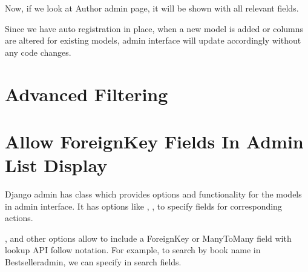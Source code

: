 \documentclass[letterpaper,12pt,english]{sphinxmanual}
\begin{document}
Now, if we look at Author admin page, it will be shown with all relevant fields.


Since we have auto registration in place, when a new model is added or columns are altered for existing models, admin interface will update accordingly without any code changes.


\chapter{Advanced Filtering}
\label{\detokenize{admin_filter:advanced-filtering}}\label{\detokenize{admin_filter::doc}}

\chapter{Allow ForeignKey Fields In Admin List Display}
\label{\detokenize{admin_list_display_foreignkey:allow-foreignkey-fields-in-admin-list-display}}\label{\detokenize{admin_list_display_foreignkey::doc}}
Django admin has  class which provides options and functionality for the models in admin interface. It has options like , ,  to specify fields for corresponding actions.

,  and other options allow to include a ForeignKey or ManyToMany field with lookup API follow notation. For example, to search by book name in Bestselleradmin, we can specify  in search fields.

\begin{sphinxVerbatim}[commandchars=\\\{\}]
   

   


 
       
         


 
\end{sphinxVerbatim}
\end{document}
